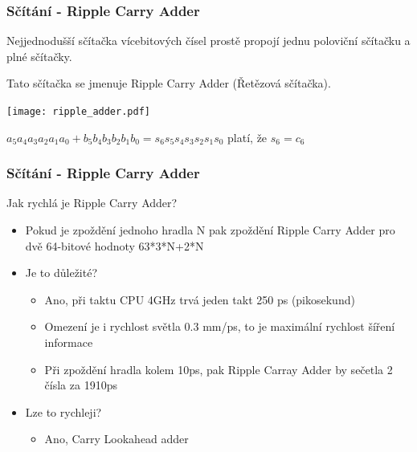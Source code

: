 \documentclass{beamer}
\begin{document}
\begin{frame}
\frametitle{Sčítání - Ripple Carry Adder}

Nejjednodušší sčítačka vícebitových čísel prostě propojí jednu poloviční sčítačku a plné sčítačky. 

Tato sčítačka se jmenuje Ripple Carry Adder (Řetězová sčítačka).

\begin{center}
   \texttt{[image: ripple\_adder.pdf]}
\end{center}

$a_5a_4a_3a_2a_1a_0 + b_5b_4b_3b_2b_1b_0 = s_6s_5s_4s_3s_2s_1s_0$ platí, že $s_6 = c_6$

\end{frame}

\begin{frame}
\frametitle{Sčítání - Ripple Carry Adder}

Jak rychlá je Ripple Carry Adder?
\begin{itemize}
\item Pokud je zpoždění jednoho hradla N pak zpoždění Ripple Carry Adder pro dvě 64-bitové hodnoty 63*3*N+2*N
\item Je to důležité?
\begin{itemize}
\item Ano, při taktu CPU 4GHz trvá jeden takt 250 ps (pikosekund)
\item Omezení je i rychlost světla 0.3 mm/ps, to je maximální rychlost šíření informace
\item Při zpoždění hradla kolem 10ps, pak Ripple Carray Adder by sečetla 2 čísla za 1910ps  
\end{itemize}
\item Lze to rychleji?
\begin{itemize}
\item Ano, Carry Lookahead adder
\end{itemize}
\end{itemize}

\end{frame}
\end{document}
